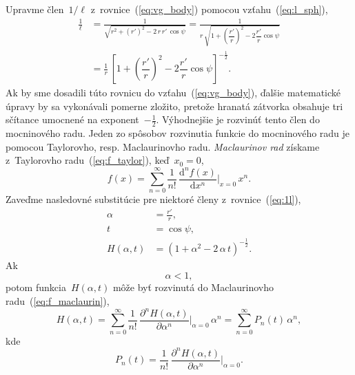 \documentclass[a4paper, 12pt]{book}
\newcommand{\diff}{\mathrm d}
\begin{document}
Upravme člen~$1 \slash \ell$ z~rovnice~(\ref{eq:vg_body}) pomocou 
vzťahu~(\ref{eq:l_sph}),
%
\begin{equation}
\label{eq:1l}
\begin{split}
\frac{1}{\ell} &= \frac{1}{\sqrt{ r^2 + (r')^2 - 2 \, r \, r' \, \cos\psi
}} = \frac{1}{r \, \sqrt{1 + \left( \dfrac{r'}{r}
\right)^2 - 2 \dfrac{r'}{r} \cos\psi}}\\
%
&=\frac{1}{r} \, \left[1 + \left( \dfrac{r'}{r}
\right)^2 - 2 \dfrac{r'}{r} \cos\psi \right]^{-\frac{1}{2}}{.}
\end{split}
\end{equation}
%
Ak by sme dosadili túto rovnicu do vzťahu~(\ref{eq:vg_body}), ďalšie 
matematické úpravy by sa vykonávali pomerne zložito, pretože hranatá zátvorka 
obsahuje tri sčítance umocnené na exponent~$-\frac{1}{2}$.  Výhodnejšie je 
rozvinúť tento člen do mocninového radu.  Jeden zo spôsobov rozvinutia funkcie 
do mocninového radu je pomocou Taylorovho, resp. Maclaurinovho radu.  
\emph{Maclaurinov rad} získame z~Taylorovho radu~(\ref{eq:f_taylor}), keď~$x_0 
= 0$,
%
\begin{equation}
\label{eq:f_maclaurin}
f(x) = \sum_{n = 0}^\infty \frac{1}{n!} \, \frac{\diff^n f(x)}{\diff x^n} 
\bigg\lvert_{x = 0} \, x^n{.}
\end{equation}
%
Zaveďme nasledovné substitúcie pre niektoré členy z~rovnice~(\ref{eq:1l}),
%
\begin{align}
\label{eq:alpha}
\alpha &= \frac{r'}{r}{,}\\
%
\label{eq:t}
t &= \cos\psi{,}\\
%
\label{eq:generic_function_for_lps}
H(\alpha, t) &= \left(1 + \alpha^2 - 2 \, \alpha\, t \right)^{-\frac{1}{2}}{.}
\end{align}
%
Ak
%
\begin{equation}
\label{eq:alpha_lt_1}
\alpha < 1{,}
\end{equation}
%
potom funkcia~$H(\alpha, t)$ môže byť rozvinutá do Maclaurinovho 
radu~(\ref{eq:f_maclaurin}),
%
\begin{equation}
\label{eq:maclaurin_series_of_generic_function}
H(\alpha, t) = \sum_{n = 0}^\infty \frac{1}{n!} \, \frac{\partial^n H(\alpha,
t)}{\partial \alpha^n} \bigg\lvert_{\alpha = 0} \, \alpha^n = \sum_{n 
= 0}^\infty P_n(t) \, \alpha^n{,}
\end{equation}
%
kde
%
\begin{equation}
\label{eq:pn}
P_n(t) = \frac{1}{n!} \, \frac{\partial^n H(\alpha, t)}{\partial \alpha^n} 
\bigg\lvert_{\alpha = 0}{.}
\end{equation}
\end{document}

